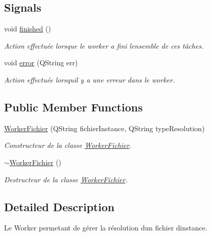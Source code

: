 \subsection*{Signals}
\begin{DoxyCompactItemize}
\item 
void \hyperlink{classWorkerFichier_a829c3872070e4cab2d84c11b7c12dccc}{finished} ()
\begin{DoxyCompactList}\small\item\em Action effectuée lorsque le worker a fini l\textquotesingle{}ensemble de ces tâches. \end{DoxyCompactList}\item 
void \hyperlink{classWorkerFichier_ae7f4b3f3ce2a053855a21d05f13e1f4e}{error} (Q\+String err)
\begin{DoxyCompactList}\small\item\em Action effectuée lorsqu\textquotesingle{}il y a une erreur dans le worker. \end{DoxyCompactList}\end{DoxyCompactItemize}
\subsection*{Public Member Functions}
\begin{DoxyCompactItemize}
\item 
\hyperlink{classWorkerFichier_a9ec0e174cceef123487826fb902fb649}{Worker\+Fichier} (Q\+String fichier\+Instance, Q\+String type\+Resolution)
\begin{DoxyCompactList}\small\item\em Constructeur de la classe \hyperlink{classWorkerFichier}{Worker\+Fichier}. \end{DoxyCompactList}\item 
\hyperlink{classWorkerFichier_acabdd12b795f6b7f656e0ed9e61cb6ca}{$\sim$\+Worker\+Fichier} ()
\begin{DoxyCompactList}\small\item\em Destructeur de la classe \hyperlink{classWorkerFichier}{Worker\+Fichier}. \end{DoxyCompactList}\end{DoxyCompactItemize}


\subsection{Detailed Description}
Le Worker permetant de gérer la résolution d\textquotesingle{}un fichier d\textquotesingle{}instance. 


